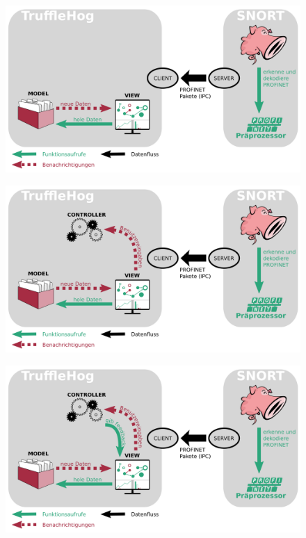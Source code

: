 \documentclass[18pt]{beamer}
\begin{document}
\begin{frame}
    \begin{figure}
    	\centering
    	\includegraphics[width=\textwidth]{./images/jan_9.png}
    \end{figure}
\end{frame}

\begin{frame}
    \begin{figure}
    	\centering
    	\includegraphics[width=\textwidth]{./images/jan_10.png}
    \end{figure}
\end{frame}

\begin{frame}
    \begin{figure}
    	\centering
    	\includegraphics[width=\textwidth]{./images/jan_11.png}
    \end{figure}
\end{frame}
\end{document}
